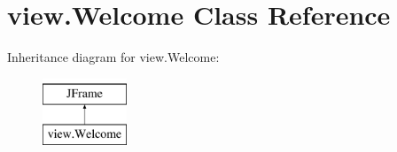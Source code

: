 \hypertarget{classview_1_1_welcome}{}\section{view.\+Welcome Class Reference}
\label{classview_1_1_welcome}
Inheritance diagram for view.\+Welcome\+:\begin{figure}[H]
\begin{center}
\leavevmode
\includegraphics[height=2.000000cm]{classview_1_1_welcome}
\end{center}
\end{figure}
